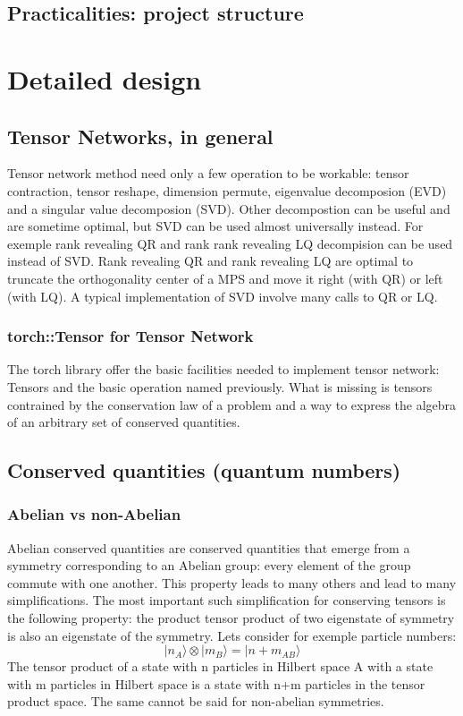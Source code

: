\documentclass[15pt]{book}
\newcommand{\ket}[1]{| #1 \rangle}
\begin{document}
\chapter{Practicalities: project structure}
\part{Detailed design}
\chapter{Tensor Networks, in general}
Tensor network method need only a few operation to be workable: tensor contraction, tensor reshape, dimension permute, eigenvalue decomposion (EVD) and a singular value decomposion (SVD).
Other decompostion can be useful and are sometime optimal, but SVD can be used almost universally instead. For exemple rank revealing QR and rank rank revealing LQ decompision can be used instead of SVD.
Rank revealing QR and rank revealing LQ are optimal to truncate the orthogonality center of a MPS and move it right (with QR) or left (with LQ). A typical implementation of SVD involve many calls to QR or LQ.
\section{torch::Tensor for Tensor Network}
The torch library offer the basic facilities needed to implement tensor network: Tensors and the basic operation named previously. What is missing is tensors contrained by the conservation law of a problem and a way to express the algebra of an arbitrary set of conserved quantities.


\chapter{Conserved quantities (quantum numbers)}

\section{Abelian vs non-Abelian}\label{sec:group}
Abelian conserved quantities are conserved quantities that emerge from a symmetry corresponding to an Abelian group: every element of the group commute with one another. This property leads to many others and lead to many simplifications. The most important such simplification for conserving tensors is the following property: the product tensor product of two eigenstate of symmetry is also an eigenstate of the symmetry. Lets consider for exemple particle numbers:
\begin{equation}
    \ket{n_A} \otimes \ket{m_B} = \ket{n+m_{AB}}
\end{equation}
The tensor product of a state with n particles in Hilbert space A with a state with m particles in Hilbert space is a state with n+m particles in the tensor product space. The same cannot be said for non-abelian symmetries.
\end{document}
